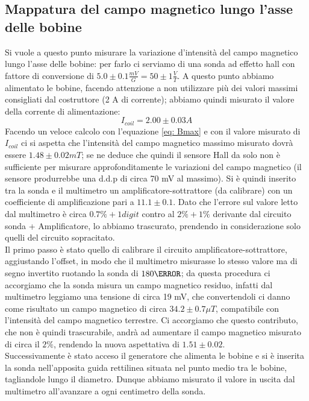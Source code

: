 \documentclass[10pt, a4paper, italian]{article}
\begin{document}
\subsection{Mappatura del campo magnetico lungo l'asse delle bobine}
Si vuole a questo punto misurare la variazione d'intensità del campo magnetico lungo l'asse delle bobine: per farlo ci serviamo di una sonda ad effetto hall con fattore di conversione di $5.0 \pm 0.1 \frac{mV}{G} = 50 \pm 1 \frac{V}{T}$.
A questo punto abbiamo alimentato le bobine, facendo attenzione a non utilizzare più dei valori massimi consigliati dal costruttore (2 A di corrente); abbiamo quindi misurato il valore della corrente di alimentazione:
\[
I_{coil}=2.00 \pm 0.03 A
\]
Facendo un veloce calcolo con l'equazione \cref{eq: Bmax} e con il valore misurato di $I_{coil}$ ci si aspetta che l'intensità del campo magnetico massimo misurato dovrà essere $1.48 \pm 0.02 \si{mT}$; se ne deduce che quindi il sensore Hall da solo non è sufficiente per misurare approfonditamente le variazioni del campo magnetico (il sensore produrrebbe una d.d.p di circa 70 mV al massimo).
Si è quindi inserito tra la sonda e il multimetro un amplificatore-sottrattore (da calibrare) con un coefficiente di amplificazione pari a $11.1 \pm 0.1$.
Dato che l'errore sul valore letto dal multimetro è circa $0.7 \percent + 1 digit$ contro al $2 \percent + 1 \percent$ derivante dal circuito sonda + Amplificatore, lo abbiamo trascurato, prendendo in considerazione solo quelli del circuito sopracitato.\\
Il primo passo è stato quello di calibrare il circuito amplificatore-sottrattore, aggiustando l'offset, in modo che il multimetro misurasse lo stesso valore ma di segno invertito ruotando la sonda di $180 \degree$; da questa procedura ci accorgiamo che la sonda misura un campo magnetico residuo, infatti dal multimetro leggiamo una tensione di circa 19 mV, che convertendoli ci danno come risultato un campo magnetico di circa $34.2 \pm 0.7 \mu T$, compatibile con l'intensità del campo magnetico terrestre. Ci accorgiamo che questo contributo, che non è quindi trascurabile, andrà ad aumentare il campo magnetico misurato di circa il $2 \percent$, rendendo la nuova aspettativa di $1.51 \pm 0.02$.\\
Successivamente è stato acceso il generatore che alimenta le bobine e si è inserita la sonda nell'apposita guida rettilinea situata nel punto medio tra le bobine, tagliandole lungo il diametro. Dunque abbiamo misurato il valore in uscita dal multimetro all'avanzare a ogni centimetro della sonda.
\end{document}
